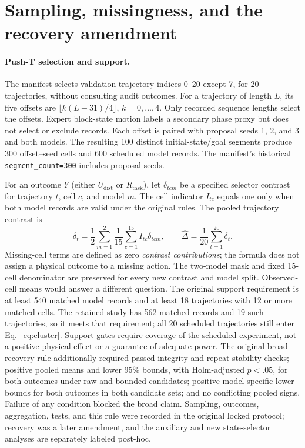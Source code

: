 \section{Sampling, missingness, and the recovery amendment}
\label{app:protocol}

\paragraph{Push-T selection and support.}
The manifest selects validation trajectory indices 0--20 except 7, for 20
trajectories, without consulting audit outcomes. For a trajectory of length
$L$, its five offsets are $\lfloor k(L-31)/4\rfloor$, $k=0,\ldots,4$.
Only recorded sequence lengths select the offsets. Expert block-state motion
labels a secondary phase proxy but does not select or exclude records.
Each offset is paired with proposal seeds 1, 2, and 3 and both models.
The resulting 100 distinct initial-state/goal segments produce 300 offset--seed
cells and 600 scheduled model records. The manifest's historical
\texttt{segment\_count=300} includes proposal seeds.

For an outcome $Y$ (either $U_{\mathrm{dist}}$ or $R_{\mathrm{task}}$), let
$\delta_{tcm}$ be a specified selector contrast for trajectory $t$, cell $c$,
and model $m$. The cell indicator $I_{tc}$ equals one only when both model
records are valid under the original rules. The pooled trajectory contrast is
\begin{equation}
 \bar\delta_t=\frac{1}{2}\sum_{m=1}^{2}
          \frac{1}{15}\sum_{c=1}^{15} I_{tc}\delta_{tcm},
 \qquad \widehat\Delta=\frac{1}{20}\sum_{t=1}^{20}\bar\delta_t.
 \label{eq:cluster}
\end{equation}
Missing-cell terms are defined as zero \emph{contrast contributions}; the
formula does not assign a physical outcome to a missing action. The two-model
mask and fixed 15-cell denominator are preserved for every new contrast and
model split. Observed-cell means would answer a different question.
The original support requirement is at least 540 matched model records and
at least 18 trajectories with 12 or more matched cells. The retained study
has 562 matched records and 19 such trajectories, so it meets that requirement;
all 20 scheduled trajectories still enter Eq.~\ref{eq:cluster}.
Support gates require coverage of the scheduled experiment, not a positive
physical effect or a guarantee of adequate power. The original broad-recovery
rule additionally required passed integrity and repeat-stability checks;
positive pooled means and lower 95\% bounds, with Holm-adjusted $p<.05$, for
both outcomes under raw and bounded candidates; positive model-specific lower
bounds for both outcomes in both candidate sets; and no conflicting pooled
signs. Failure of any condition blocked the broad claim. Sampling, outcomes,
aggregation, tests, and this rule were recorded in the original locked protocol;
recovery was a later amendment, and the auxiliary and new state-selector
analyses are separately labeled post-hoc.

